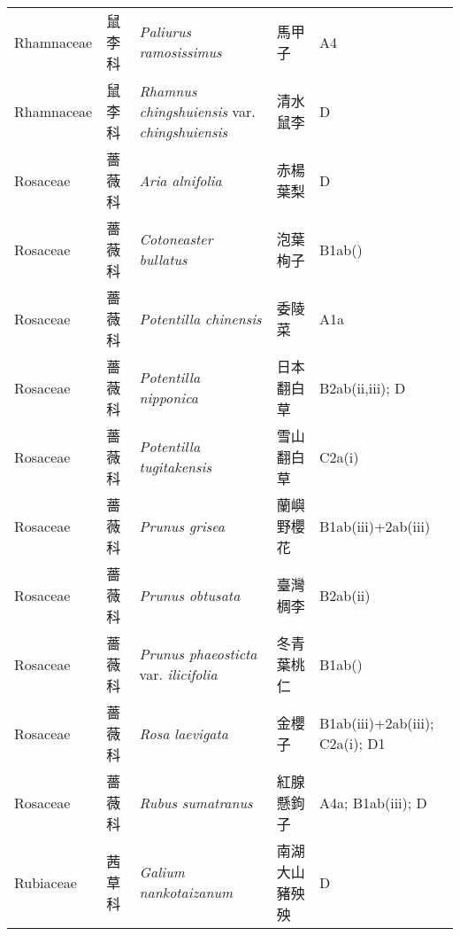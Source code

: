 {\begin{longtable}{p{2.5cm}p{2.5cm}p{4.5cm}p{2.5cm}p{3cm}}
    Rhamnaceae & 鼠李科 & \textit{Paliurus ramosissimus}  & 馬甲子 & A4 \index{Paliurus@\textit{Paliurus}!ramosissimus@\textit{ramosissimus}}  \index{馬甲子} \\
    Rhamnaceae & 鼠李科 & \textit{Rhamnus chingshuiensis} var. \textit{chingshuiensis}  & 清水鼠李 & D \index{Rhamnus@\textit{Rhamnus}!chingshuiensis@\textit{chingshuiensis}!var. chingshuiensis@var. \textit{chingshuiensis}}  \index{清水鼠李} \\
    Rosaceae & 薔薇科 & \textit{Aria alnifolia}  & 赤楊葉梨 & D \index{Aria@\textit{Aria}!alnifolia@\textit{alnifolia}}  \index{赤楊葉梨} \\
    Rosaceae & 薔薇科 & \textit{Cotoneaster bullatus}  & 泡葉栒子 & B1ab() \index{Cotoneaster@\textit{Cotoneaster}!bullatus@\textit{bullatus}}  \index{泡葉栒子} \\
    Rosaceae & 薔薇科 & \textit{Potentilla chinensis}  & 委陵菜 & A1a \index{Potentilla@\textit{Potentilla}!chinensis@\textit{chinensis}}  \index{委陵菜} \\
    Rosaceae & 薔薇科 & \textit{Potentilla nipponica}  & 日本翻白草 & B2ab(ii,iii); D \index{Potentilla@\textit{Potentilla}!nipponica@\textit{nipponica}}  \index{日本翻白草} \\
    Rosaceae & 薔薇科 & \textit{Potentilla tugitakensis}  & 雪山翻白草 & C2a(i) \index{Potentilla@\textit{Potentilla}!tugitakensis@\textit{tugitakensis}}  \index{雪山翻白草} \\
    Rosaceae & 薔薇科 & \textit{Prunus grisea}  & 蘭嶼野櫻花 & B1ab(iii)+2ab(iii) \index{Prunus@\textit{Prunus}!grisea@\textit{grisea}}  \index{蘭嶼野櫻花} \\
    Rosaceae & 薔薇科 & \textit{Prunus obtusata}  & 臺灣椆李 & B2ab(ii) \index{Prunus@\textit{Prunus}!obtusata@\textit{obtusata}}  \index{臺灣椆李} \\
    Rosaceae & 薔薇科 & \textit{Prunus phaeosticta} var. \textit{ilicifolia}  & 冬青葉桃仁 & B1ab() \index{Prunus@\textit{Prunus}!phaeosticta@\textit{phaeosticta}!var. ilicifolia@var. \textit{ilicifolia}}  \index{冬青葉桃仁} \\
    Rosaceae & 薔薇科 & \textit{Rosa laevigata}  & 金櫻子 & B1ab(iii)+2ab(iii); C2a(i); D1 \index{Rosa@\textit{Rosa}!laevigata@\textit{laevigata}}  \index{金櫻子} \\
    Rosaceae & 薔薇科 & \textit{Rubus sumatranus}  & 紅腺懸鉤子 & A4a; B1ab(iii); D \index{Rubus@\textit{Rubus}!sumatranus@\textit{sumatranus}}  \index{紅腺懸鉤子} \\
    Rubiaceae & 茜草科 & \textit{Galium nankotaizanum}  & 南湖大山豬殃殃 & D \index{Galium@\textit{Galium}!nankotaizanum@\textit{nankotaizanum}}  \index{南湖大山豬殃殃} \\

\end{longtable}}

